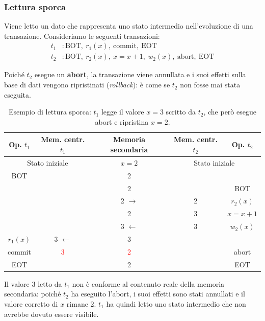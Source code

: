 \subsubsection{Lettura sporca}

Viene letto un dato che rappresenta uno stato intermedio nell'evoluzione di una transazione. Consideriamo le seguenti transazioni:
\begin{align*}
	t_1 &: \text{BOT},\ r_1(x),\ \text{commit},\ \text{EOT} \\
	t_2 &: \text{BOT},\ r_2(x),\ x = x+1,\ w_2(x),\ \text{abort},\ \text{EOT}
\end{align*}

Poiché $t_2$ esegue un \textbf{abort}, la transazione viene annullata e i suoi effetti sulla base di dati vengono ripristinati (\textit{rollback}): è come se $t_2$ non fosse mai stata eseguita.

\begin{table}[H]
	\centering
	\begin{tabular}{|c|c|c|c|c|}
		\hline
		\textbf{Op. $t_1$} & \textbf{Mem. centr. $t_1$} & \textbf{Memoria secondaria} & \textbf{Mem. centr. $t_2$} & \textbf{Op. $t_2$} \\
		\hline
		\multicolumn{2}{|c|}{Stato iniziale} & $x = 2$ & \multicolumn{2}{c|}{Stato iniziale} \\
		\hline
		BOT & & 2 & & \\
		\hline
		& & 2 & & BOT \\
		\hline
		& & 2 $\rightarrow$ & 2 & $r_2(x)$ \\
		\hline
		& & 2 & 3 & $x = x+1$ \\
		\hline
		& & 3 $\leftarrow$ & 3 & $w_2(x)$ \\
		\hline
		\rowcolor{red!15}
		$r_1(x)$ & 3 $\leftarrow$ & 3 & & \\
		\hline
		\rowcolor{red!15}
		commit & \textcolor{red}{3} & \textcolor{red}{2} & & abort \\
		\hline
		EOT & & 2 & & EOT \\
		\hline
	\end{tabular}
	\caption{Esempio di lettura sporca: $t_1$ legge il valore $x = 3$ scritto da $t_2$, che però esegue abort e ripristina $x = 2$.}
\end{table}

Il valore 3 letto da $t_1$ non è conforme al contenuto reale della memoria secondaria: poiché $t_2$ ha eseguito l'abort, i suoi effetti sono stati annullati e il valore corretto di $x$ rimane 2. $t_1$ ha quindi letto uno stato intermedio che non avrebbe dovuto essere visibile.
